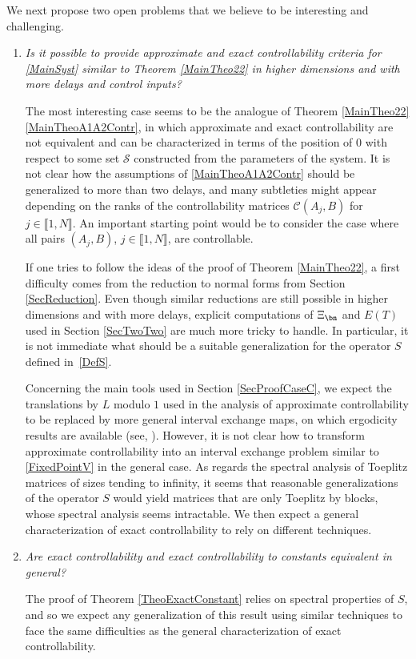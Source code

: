 We next propose two open problems that we believe to be interesting and challenging.\enlargethispage{-.1\baselineskip}%

\begin{enumerate}
\item \emph{Is it possible to provide approximate and exact controllability criteria for \eqref{MainSyst} similar to Theorem \ref{MainTheo22} in higher dimensions and with more delays and control inputs?}

The most interesting case seems to be the analogue of Theorem \ref{MainTheo22}\eqref{MainTheoA1A2Contr}, in which approximate and exact controllability are not equivalent and can be characterized in terms of the position of $0$ with respect to some set $\mathcal S$ constructed from the parameters of the system. It is not clear how the assumptions of \eqref{MainTheoA1A2Contr} should be generalized to more than two delays, and many subtleties might appear depending on the ranks of the controllability matrices $\mathcal C(A_j, B)$ for $j \in \llbracket 1, N\rrbracket$. An important starting point would be to consider the case where all pairs $(A_j, B)$, $j \in \llbracket 1, N\rrbracket$, are controllable.

If one tries to follow the ideas of the proof of Theorem \ref{MainTheo22}, a first difficulty comes from the reduction to normal forms from Section \ref{SecReduction}. Even though similar reductions are still possible in higher dimensions and with more delays, explicit computations of $\Xi_{\bn}$ and $E(T)$ used in Section \ref{SecTwoTwo} are much more tricky to handle. In particular, it is not immediate what should be a suitable generalization for the operator $S$ defined in~\eqref{DefS}.

Concerning the main tools used in Section \ref{SecProofCaseC}, we expect the translations by $L$ modulo $1$ used in the analysis of approximate controllability to be replaced by more general interval exchange maps, on which ergodicity results are available (see, \hbox{\eg \cite{Viana2006Ergodic}}). However, it is not clear how to transform approximate controllability into an interval exchange problem similar to \eqref{FixedPointV} in the general case. As regards the spectral analysis of Toeplitz matrices of sizes tending to infinity, it seems that reasonable generalizations of the operator $S$ would yield matrices that are only Toeplitz by blocks, whose spectral analysis seems intractable. We then expect a general characterization of exact controllability to rely on different techniques.

\item \emph{Are exact controllability and exact controllability to constants equivalent in general?}

The proof of Theorem \ref{TheoExactConstant} relies on spectral properties of $S$, and so we expect any generalization of this result using similar techniques to face the same difficulties as the general characterization of exact controllability.
\end{enumerate}

